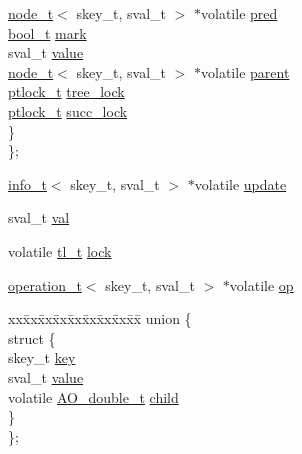 \begin{DoxyCompactItemize}
\begin{tabbing}
\>\>\hyperlink{structnode__t}{node\_t}$<$ skey\_t, sval\_t $>$ $\ast$volatile \hyperlink{structnode__t_a7a0e625afa9ffa7429bd055e64aedf27}{pred}\\
\>\>\hyperlink{drachsler__impl_8h_a57c3b7201116536b822f0f8520aa99c7}{bool\_t} \hyperlink{structnode__t_a5977cf60c984f00d4aa29052ca0c3119}{mark}\\
\>\>sval\_t \hyperlink{structnode__t_afa5c26cdc749c26fcbc550baf6e97717}{value}\\
\>\>\hyperlink{structnode__t}{node\_t}$<$ skey\_t, sval\_t $>$ $\ast$volatile \hyperlink{structnode__t_a3ab6091479bf16f761c8cfe1d2ca78bf}{parent}\\
\>\>\hyperlink{ccavl__impl_8h_a61cf36cb33c84af9c784f95686701a94}{ptlock\_t} \hyperlink{structnode__t_a172896833cd7a9331b2afabc55c1914a}{tree\_lock}\\
\>\>\hyperlink{ccavl__impl_8h_a61cf36cb33c84af9c784f95686701a94}{ptlock\_t} \hyperlink{structnode__t_afeeaa8165d380652af96618f36213252}{succ\_lock}\\
\>\} \\
\}; \\

\end{tabbing}\item 
\hyperlink{unioninfo__t}{info\+\_\+t}$<$ skey\+\_\+t, sval\+\_\+t $>$ $\ast$volatile \hyperlink{structnode__t_a3009fd14ae83f7f3a307450005261482}{update}
\item 
sval\+\_\+t \hyperlink{structnode__t_aca6e214f7ceac5575365b70fbf2a6693}{val}
\item 
volatile \hyperlink{ticket__impl_8h_aa989d88f1299dac19db854e7c54a1615}{tl\+\_\+t} \hyperlink{structnode__t_a7c381d5204a650a3db959fc75b644800}{lock}
\item 
\hyperlink{unionoperation__t}{operation\+\_\+t}$<$ skey\+\_\+t, sval\+\_\+t $>$ $\ast$volatile \hyperlink{structnode__t_add56a7213e59cec443dda8f4b786d938}{op}
\item 
\begin{tabbing}
xx\=xx\=xx\=xx\=xx\=xx\=xx\=xx\=xx\=\kill
union \{\\
\>struct \{\\
\>\>skey\_t \hyperlink{structnode__t_ad38b63280bb7c69e5991653ce673dc35}{key}\\
\>\>sval\_t \hyperlink{structnode__t_afa5c26cdc749c26fcbc550baf6e97717}{value}\\
\>\>volatile \hyperlink{structAO__double__t}{AO\_double\_t} \hyperlink{structnode__t_a87d96c3bd4e3cac7919e7f8878d73d4b}{child}\\
\>\} \\
\}; \\


\end{tabbing}
\end{DoxyCompactItemize}
